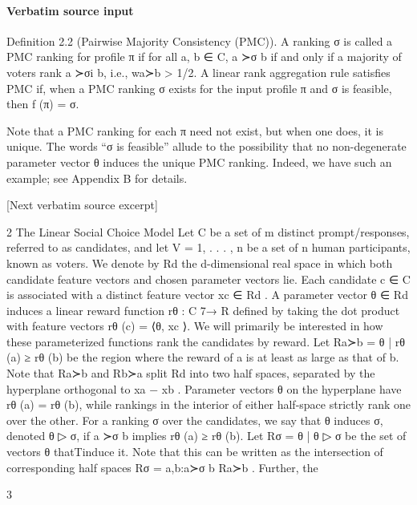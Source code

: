 \documentclass[10pt]{article}
\begin{document}
\paragraph{Verbatim source input}
\begin{ReviewVerbatim}
Definition 2.2 (Pairwise Majority Consistency (PMC)). A ranking σ is called a PMC ranking for
profile π if for all a, b ∈ C, a ≻σ b if and only if a majority of voters rank a ≻σi b, i.e., wa≻b > 1/2.
A linear rank aggregation rule satisfies PMC if, when a PMC ranking σ exists for the input profile
π and σ is feasible, then f (π) = σ.

Note that a PMC ranking for each π need not exist, but when one does, it is unique. The words “σ
is feasible” allude to the possibility that no non-degenerate parameter vector θ induces the unique
PMC ranking. Indeed, we have such an example; see Appendix B for details.

[Next verbatim source excerpt]

2     The Linear Social Choice Model
Let C be a set of m distinct prompt/responses, referred to as candidates, and let V = {1, . . . , n} be
a set of n human participants, known as voters. We denote by Rd the d-dimensional real space in
which both candidate feature vectors and chosen parameter vectors lie.
Each candidate c ∈ C is associated with a distinct feature vector xc ∈ Rd . A parameter vector
θ ∈ Rd induces a linear reward function rθ : C 7→ R defined by taking the dot product with feature
vectors rθ (c) = ⟨θ, xc ⟩. We will primarily be interested in how these parameterized functions rank
the candidates by reward. Let Ra≻b = {θ | rθ (a) ≥ rθ (b)} be the region where the reward of a is
at least as large as that of b. Note that Ra≻b and Rb≻a split Rd into two half spaces, separated by
the hyperplane orthogonal to xa − xb . Parameter vectors θ on the hyperplane have rθ (a) = rθ (b),
while rankings in the interior of either half-space strictly rank one over the other.
For a ranking σ over the candidates, we say that θ induces σ, denoted θ ▷ σ, if a ≻σ b implies
rθ (a) ≥ rθ (b). Let Rσ = {θ | θ ▷ σ} be the set of vectors θ thatTinduce it. Note that this can
be written as the intersection of corresponding half spaces Rσ = a,b:a≻σ b Ra≻b . Further, the


                                                    3


\end{ReviewVerbatim}
\end{document}
